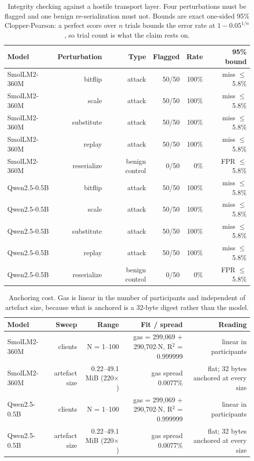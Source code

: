 \begin{table}[t]
\centering
\small
\caption{Integrity checking against a hostile transport layer. Four perturbations must be flagged and one benign re-serialization must not. Bounds are exact one-sided 95\% Clopper-Pearson: a perfect score over $n$ trials bounds the error rate at $1-0.05^{1/n}$, so trial count is what the claim rests on.}
\label{tab:tamper}
\begin{tabular}{lrrrrr}
\toprule
\textbf{Model} & \textbf{Perturbation} & \textbf{Type} & \textbf{Flagged} & \textbf{Rate} & \textbf{95\% bound} \\
\midrule
SmolLM2-360M & bitflip & attack & 50/50 & 100\% & miss $\leq$ 5.8\% \\
SmolLM2-360M & scale & attack & 50/50 & 100\% & miss $\leq$ 5.8\% \\
SmolLM2-360M & substitute & attack & 50/50 & 100\% & miss $\leq$ 5.8\% \\
SmolLM2-360M & replay & attack & 50/50 & 100\% & miss $\leq$ 5.8\% \\
SmolLM2-360M & reserialize & benign control & 0/50 & 0\% & FPR $\leq$ 5.8\% \\
Qwen2.5-0.5B & bitflip & attack & 50/50 & 100\% & miss $\leq$ 5.8\% \\
Qwen2.5-0.5B & scale & attack & 50/50 & 100\% & miss $\leq$ 5.8\% \\
Qwen2.5-0.5B & substitute & attack & 50/50 & 100\% & miss $\leq$ 5.8\% \\
Qwen2.5-0.5B & replay & attack & 50/50 & 100\% & miss $\leq$ 5.8\% \\
Qwen2.5-0.5B & reserialize & benign control & 0/50 & 0\% & FPR $\leq$ 5.8\% \\
\bottomrule
\end{tabular}
\end{table}

\begin{table}[t]
\centering
\small
\caption{Anchoring cost. Gas is linear in the number of participants and independent of artefact size, because what is anchored is a 32-byte digest rather than the model.}
\label{tab:gas}
\begin{tabular}{lrrrr}
\toprule
\textbf{Model} & \textbf{Sweep} & \textbf{Range} & \textbf{Fit / spread} & \textbf{Reading} \\
\midrule
SmolLM2-360M & clients & N = 1--100 & gas = 299,069 + 290,702$\cdot$N, R$^2$ = 0.999999 & linear in participants \\
SmolLM2-360M & artefact size & 0.22--49.1 MiB (220$\times$) & gas spread 0.0077\% & flat; 32 bytes anchored at every size \\
Qwen2.5-0.5B & clients & N = 1--100 & gas = 299,069 + 290,702$\cdot$N, R$^2$ = 0.999999 & linear in participants \\
Qwen2.5-0.5B & artefact size & 0.22--49.1 MiB (220$\times$) & gas spread 0.0077\% & flat; 32 bytes anchored at every size \\
\bottomrule
\end{tabular}
\end{table}

